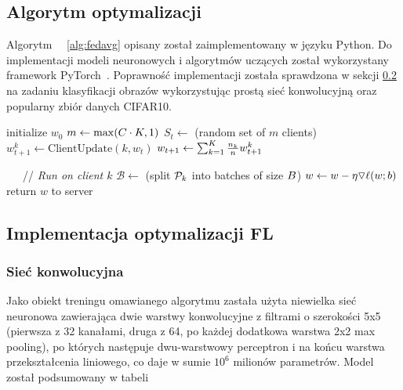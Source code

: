 \subsection{Algorytm optymalizacji}
  Algorytm \fedavglong~\cite{FLBasic}~\ref{alg:fedavg} opisany został zaimplementowany w języku Python. Do implementacji modeli
  neuronowych i algorytmów uczących został wykorzystany framework
  PyTorch~\cite{PyTorch}. Poprawność implementacji została sprawdzona w sekcji \ref{implementacja_fl} na zadaniu klasyfikacji obrazów wykorzystując prostą sieć konwolucyjną oraz popularny zbiór danych CIFAR10. 
  \begin{polishalgorithm}[t]

    \begin{algorithmic}
      \STATE{} initialize $w_0$
        \STATE{} $m \leftarrow \max(C\cdot K, 1)$
        \STATE{} $S_t \leftarrow$ (random set of $m$ clients)
          \STATE{} $w_{t+1}^k \leftarrow \text{ClientUpdate}(k, w_t)$ 
        \ENDFOR{}
        \STATE{} $w_{t+1} \leftarrow \sum_{k=1}^K \frac{n_k}{n} w_{t+1}^k$
      \ENDFOR{}
      \STATE{}
    
    \ \ \  // \emph{Run on client $k$}
      \STATE{} $\mathcal{B} \leftarrow$ (split $\mathcal{P}_k$ into batches of size $B$)
          \STATE{} $w \leftarrow w - \eta \triangledown \ell(w; b)$
        \ENDFOR{}
    \ENDFOR{}
    \STATE{} return $w$ to server
    \end{algorithmic}
    \label{alg:fedavg}
    \end{polishalgorithm}



  \subsection{Implementacja optymalizacji FL}\label{implementacja_fl}
  \subsubsection{Sieć konwolucyjna}

  Jako obiekt treningu omawianego algorytmu zastała użyta niewielka sieć neuronowa zawierająca
  dwie warstwy konwolucyjne z filtrami o szerokości 5x5 (pierwsza z 32 kanałami, druga z 64, po
  każdej dodatkowa warstwa 2x2 max pooling), po których następuje dwu-warstwowy perceptron i na
  końcu warstwa przekształcenia liniowego, co daje w sumie \(10^6\) milionów parametrów. Model został podsumowany w tabeli 


